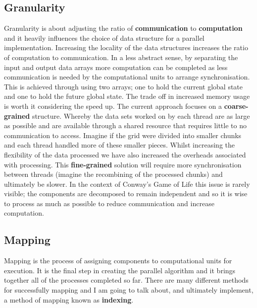 \documentclass[11pt]{article} %
\begin{document}
\subsection*{Granularity}
Granularity is about adjusting the ratio of {\bf communication} to {\bf computation} and it heavily influences the choice of data structure for a parallel implementation. Increasing the locality of the data structures increases the ratio of computation to communication. In a less abstract sense, by separating the input and output data arrays more computation can be completed as less communication is needed by the computational units to arrange synchronisation. This is achieved through using two arrays; one to hold the current global state and one to hold the future global state. The trade off in increased memory usage is worth it considering the speed up.\cite[p87]{ref9} The current approach focuses on a {\bf coarse-grained} structure. Whereby the data sets worked on by each thread are as large as possible and are available through a shared resource that requires little to no communication to access. Imagine if the grid were divided into smaller chunks and each thread handled more of these smaller pieces. Whilst increasing the flexibility of the data processed we have also increased the overheads associated with processing. This {\bf fine-grained} solution will require more synchronisation between threads (imagine the recombining of the processed chunks) and ultimately be slower. In the context of Conway's Game of Life this issue is rarely visible; the components are decomposed to remain independent and so it is wise to process as much as possible to reduce communication and increase computation.
\subsection*{Mapping}
Mapping is the process of assigning components to computational units for execution. It is the final step in creating the parallel algorithm and it brings together all of the processes completed so far. There are many different methods for successfully mapping and I am going to talk about, and ultimately implement, a method of mapping known as {\bf indexing}.
\end{document}
